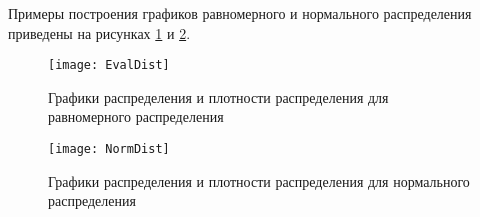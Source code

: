 Примеры построения графиков равномерного и нормального распределения приведены на рисунках \ref{pic:eval} и \ref{pic:norm}.

\begin{figure}[h]
	\begin{center}
		{\texttt{[image: EvalDist]}}
		\caption{Графики распределения и плотности распределения для равномерного распределения}
		\label{pic:eval}
	\end{center}
\end{figure}

\begin{figure}[h]
	\begin{center}
		{\texttt{[image: NormDist]}}
		\caption{Графики распределения и плотности распределения для нормального распределения}
		\label{pic:norm}
	\end{center}
\end{figure}